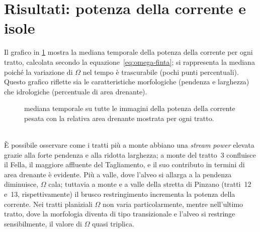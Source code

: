 \section{Risultati: potenza della corrente e isole}
Il grafico in \cref{graph:omega-perc-50} mostra la mediana temporale della potenza della corrente per ogni tratto, calcolata secondo la equazione~\eqref{eq:omega-finta}; si rappresenta la mediana poiché la variazione di $\Omega$ nel tempo è trascurabile (pochi punti percentuali).
Questo grafico riflette sia le caratteristiche morfologiche (pendenza e larghezza) che idrologiche (percentuale di area drenante).
%
\begin{figure}
	\centering
	
	\caption[potenza della corrente in ogni tratto]{mediana temporale su tutte le immagini della potenza della corrente pesata con la relativa area drenante mostrata per ogni tratto.}
	\label{graph:omega-perc-50}
\end{figure}
%
\\
È possibile osservare come i tratti più a monte abbiano una \emph{stream power} elevata grazie alla forte pendenza e alla ridotta larghezza; a monte del tratto~3 confluisce il Fella, il maggiore affluente del Tagliamento, e il suo contributo in termini di area drenante è evidente.
Più a valle, dove l'alveo si allarga a la pendenza diminuisce, $\Omega$ cala; tuttavia a monte e a valle della stretta di Pinzano (tratti~12 e~13, rispettivamente) il brusco restringimento incrementa la potenza della corrente.
Nei tratti planiziali $\Omega$ non varia particolarmente, mentre nell'ultimo tratto, dove la morfologia diventa di tipo transizionale e l'alveo si restringe sensibilmente, il valore di $\Omega$ quasi triplica.

